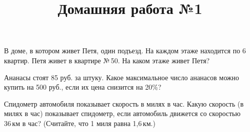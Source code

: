 \newpage
\title{Домашняя работа №1}
\begin{listofex}
	\item В доме, в котором живет Петя, один подъезд. На каждом этаже находится по 6 квартир. Петя живет в квартире № 50. На каком этаже живет Петя? 
	\item Ананасы стоят 85 руб. за штуку. Какое максимальное число ананасов можно купить на 500 руб., если их цена снизится на 20\%? 
	\item Спидометр автомобиля показывает скорость в милях в час. Какую скорость (в милях в час) показывает спидометр, если автомобиль движется со скоростью 36 км в час? (Считайте, что 1 миля равна 1,6 км.) 
\end{listofex}
%
%
%
%
%
%
%
%
